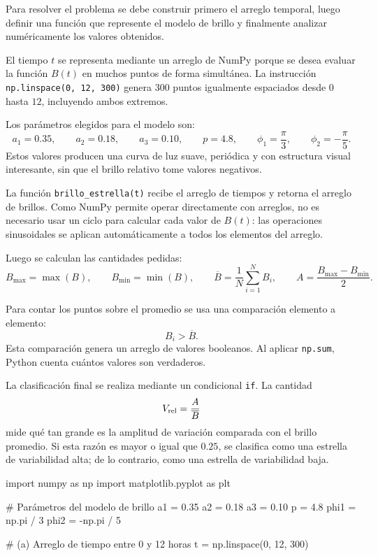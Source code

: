 \begin{solution}
Para resolver el problema se debe construir primero el arreglo temporal, luego definir una función que represente el modelo de brillo y finalmente analizar numéricamente los valores obtenidos.

El tiempo $t$ se representa mediante un arreglo de NumPy porque se desea evaluar la función $B(t)$ en muchos puntos de forma simultánea. La instrucción \texttt{np.linspace(0, 12, 300)} genera $300$ puntos igualmente espaciados desde $0$ hasta $12$, incluyendo ambos extremos.

Los parámetros elegidos para el modelo son:
\[
a_1 = 0.35, 
\qquad 
a_2 = 0.18,
\qquad 
a_3 = 0.10,
\qquad
p = 4.8,
\qquad
\phi_1 = \frac{\pi}{3},
\qquad
\phi_2 = -\frac{\pi}{5}.
\]
Estos valores producen una curva de luz suave, periódica y con estructura visual interesante, sin que el brillo relativo tome valores negativos.

La función \texttt{brillo\_estrella(t)} recibe el arreglo de tiempos y retorna el arreglo de brillos. Como NumPy permite operar directamente con arreglos, no es necesario usar un ciclo para calcular cada valor de $B(t)$: las operaciones sinusoidales se aplican automáticamente a todos los elementos del arreglo.

Luego se calculan las cantidades pedidas:
\[
B_{\max} = \max(B),
\qquad
B_{\min} = \min(B),
\qquad
\overline{B} = \frac{1}{N}\sum_{i=1}^{N} B_i,
\qquad
A = \frac{B_{\max}-B_{\min}}{2}.
\]

Para contar los puntos sobre el promedio se usa una comparación elemento a elemento:
\[
B_i > \overline{B}.
\]
Esta comparación genera un arreglo de valores booleanos. Al aplicar \texttt{np.sum}, Python cuenta cuántos valores son verdaderos.

La clasificación final se realiza mediante un condicional \texttt{if}. La cantidad
\[
V_{\rm rel}=\frac{A}{\overline{B}}
\]
mide qué tan grande es la amplitud de variación comparada con el brillo promedio. Si esta razón es mayor o igual que $0.25$, se clasifica como una estrella de variabilidad alta; de lo contrario, como una estrella de variabilidad baja.

\begin{pythonjupyter}
import numpy as np
import matplotlib.pyplot as plt

# Parámetros del modelo de brillo
a1 = 0.35
a2 = 0.18
a3 = 0.10
p = 4.8
phi1 = np.pi / 3
phi2 = -np.pi / 5

# (a) Arreglo de tiempo entre 0 y 12 horas
t = np.linspace(0, 12, 300)


\end{pythonjupyter}
\end{solution}
